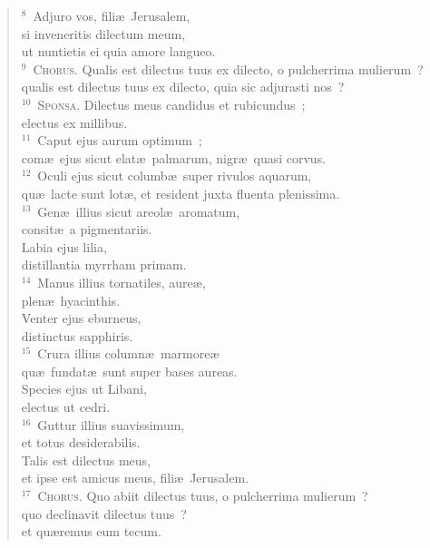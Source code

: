 \begin{flushleft}
\begin{verse}
${}^{8}$~Adjuro vos, fili\ae\ Jerusalem,\\ si inveneritis dilectum meum,\\ ut nuntietis ei quia amore langueo.\\
${}^{9}$~\textsc{Chorus.} Qualis est dilectus tuus ex dilecto, o pulcherrima mulierum~?\\ qualis est dilectus tuus ex dilecto, quia sic adjurasti nos~?\\
${}^{10}$~\textsc{Sponsa.} Dilectus meus candidus et rubicundus~;\\ electus ex millibus.\\
${}^{11}$~Caput ejus aurum optimum~;\\ com\ae\ ejus sicut elat\ae\ palmarum, nigr\ae\ quasi corvus.\\
${}^{12}$~Oculi ejus sicut columb\ae\ super rivulos aquarum,\\ qu\ae\ lacte sunt lot\ae , et resident juxta fluenta plenissima.\\
${}^{13}$~Gen\ae\ illius sicut areol\ae\ aromatum,\\ consit\ae\ a pigmentariis.\\ Labia ejus lilia,\\ distillantia myrrham primam.\\
${}^{14}$~Manus illius tornatiles, aure\ae ,\\ plen\ae\ hyacinthis.\\ Venter ejus eburneus,\\ distinctus sapphiris.\\
${}^{15}$~Crura illius column\ae\ marmore\ae \\ qu\ae\ fundat\ae\ sunt super bases aureas.\\ Species ejus ut Libani,\\ electus ut cedri.\\
${}^{16}$~Guttur illius suavissimum,\\ et totus desiderabilis.\\ Talis est dilectus meus,\\ et ipse est amicus meus, fili\ae\ Jerusalem.\\
${}^{17}$~\textsc{Chorus.} Quo abiit dilectus tuus, o pulcherrima mulierum~?\\ quo declinavit dilectus tuus~?\\ et qu\ae remus eum tecum.\end{verse}\end{flushleft}


